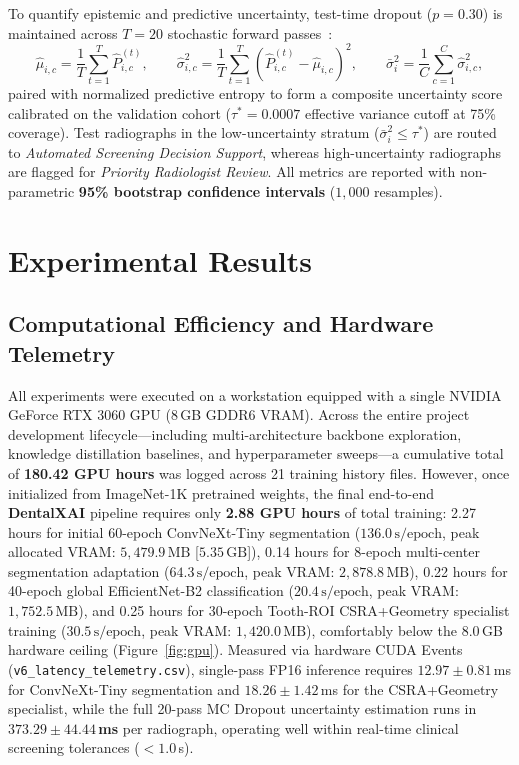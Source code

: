 \documentclass[review]{elsarticle}
\begin{document}
To quantify epistemic and predictive uncertainty, test-time dropout ($p=0.30$) is maintained across $T=20$ stochastic forward passes~\cite{gal2016dropout}:
\begin{equation}
    \hat{\mu}_{i,c} = \frac{1}{T}\sum_{t=1}^{T} \hat{P}^{(t)}_{i,c}, \qquad \hat{\sigma}^2_{i,c} = \frac{1}{T}\sum_{t=1}^{T}\left(\hat{P}^{(t)}_{i,c} - \hat{\mu}_{i,c}\right)^2, \qquad \bar{\sigma}^2_i = \frac{1}{C}\sum_{c=1}^{C} \hat{\sigma}^2_{i,c},
    \label{eq:mc_dropout}
\end{equation}
paired with normalized predictive entropy to form a composite uncertainty score calibrated on the validation cohort ($\tau^* = 0.0007$ effective variance cutoff at 75\% coverage). Test radiographs in the low-uncertainty stratum ($\bar{\sigma}^2_i \le \tau^*$) are routed to \emph{Automated Screening Decision Support}, whereas high-uncertainty radiographs are flagged for \emph{Priority Radiologist Review}. All metrics are reported with non-parametric \textbf{95\% bootstrap confidence intervals} ($1,000$ resamples).

\section{Experimental Results}
\label{sec:results}

\subsection{Computational Efficiency and Hardware Telemetry}
All experiments were executed on a workstation equipped with a single NVIDIA GeForce RTX 3060 GPU (8\,GB GDDR6 VRAM). Across the entire project development lifecycle---including multi-architecture backbone exploration, knowledge distillation baselines, and hyperparameter sweeps---a cumulative total of \textbf{180.42 GPU hours} was logged across 21 training history files. However, once initialized from ImageNet-1K pretrained weights, the final end-to-end \textbf{DentalXAI} pipeline requires only \textbf{2.88 GPU hours} of total training: 2.27 hours for initial 60-epoch ConvNeXt-Tiny segmentation ($136.0\,\text{s/epoch}$, peak allocated VRAM: $5,479.9\,\text{MB}$ [$5.35\,\text{GB}$]), 0.14 hours for 8-epoch multi-center segmentation adaptation ($64.3\,\text{s/epoch}$, peak VRAM: $2,878.8\,\text{MB}$), 0.22 hours for 40-epoch global EfficientNet-B2 classification ($20.4\,\text{s/epoch}$, peak VRAM: $1,752.5\,\text{MB}$), and 0.25 hours for 30-epoch Tooth-ROI CSRA+Geometry specialist training ($30.5\,\text{s/epoch}$, peak VRAM: $1,420.0\,\text{MB}$), comfortably below the 8.0\,GB hardware ceiling (Figure~\ref{fig:gpu}). Measured via hardware CUDA Events (\texttt{v6\_latency\_telemetry.csv}), single-pass FP16 inference requires $12.97 \pm 0.81$\,ms for ConvNeXt-Tiny segmentation and $18.26 \pm 1.42$\,ms for the CSRA+Geometry specialist, while the full 20-pass MC Dropout uncertainty estimation runs in \textbf{$373.29 \pm 44.44$\,ms} per radiograph, operating well within real-time clinical screening tolerances ($<1.0$\,s).
\end{document}
